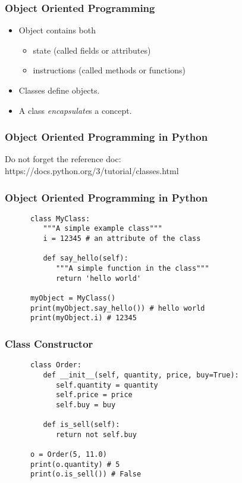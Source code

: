 \begin{frame}
\frametitle{Object Oriented Programming}
   \begin{itemize}
      \item Object contains both
            \begin{itemize}
               \item state (called fields or attributes)
               \item instructions (called methods or functions)
            \end{itemize}
      \item Classes define objects.
      \item A class \textit{encapsulate}s a concept.
   \end{itemize}
\end{frame}

\begin{frame}
\frametitle{Object Oriented Programming in Python}
   Do not forget the reference doc: \\
   https://docs.python.org/3/tutorial/classes.html
\end{frame}

\begin{frame}[fragile]
\frametitle{Object Oriented Programming in Python}
   \begin{verbatim}
      class MyClass:
         """A simple example class"""
         i = 12345 # an attribute of the class

         def say_hello(self):
            """A simple function in the class"""
            return 'hello world'

      myObject = MyClass()
      print(myObject.say_hello()) # hello world
      print(myObject.i) # 12345
   \end{verbatim}
\end{frame}

\begin{frame}[fragile]
\frametitle{Class Constructor}
   \begin{verbatim}
      class Order:
         def __init__(self, quantity, price, buy=True):
            self.quantity = quantity
            self.price = price
            self.buy = buy

         def is_sell(self):
            return not self.buy

      o = Order(5, 11.0)
      print(o.quantity) # 5
      print(o.is_sell()) # False
   \end{verbatim}
\end{frame}

